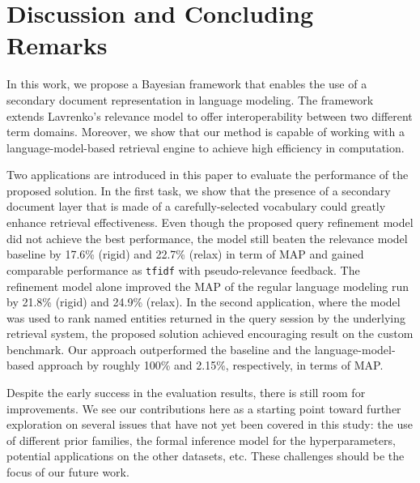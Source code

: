 \section{Discussion and Concluding Remarks}\label{s:concluding-remarks}

In this work, we propose a Bayesian framework that enables the use of a
secondary document representation in language modeling.  The framework extends
Lavrenko's relevance model to offer interoperability between two different
term domains.  Moreover, we show that our method is capable of working with a
language-model-based retrieval engine to achieve high efficiency in
computation.  

Two applications are introduced in this paper to evaluate the performance of
the proposed solution.  In the first task, we show that the presence of a
secondary document layer that is made of a carefully-selected vocabulary could
greatly enhance retrieval effectiveness.  Even though the proposed query
refinement model did not achieve the best performance, the model still beaten
the relevance model baseline by 17.6\% (rigid) and 22.7\% (relax) in term of
MAP and gained comparable performance as {\tt tfidf} with pseudo-relevance
feedback.  The refinement model alone improved the MAP of the regular language
modeling run by 21.8\% (rigid) and 24.9\% (relax).  In the second application,
where the model was used to rank named entities returned in the query session
by the underlying retrieval system, the proposed solution achieved encouraging
result on the custom benchmark.  Our approach outperformed the baseline and the language-model-based
approach \cite{balog2009language} by roughly 100\% and 2.15\%, respectively, in terms of MAP.

Despite the early success in the evaluation results, there is still room for
improvements.  We see our contributions here as a starting point toward further
exploration on several issues that have not yet been covered in this study: the
use of different prior families, the formal inference model for the
hyperparameters, potential applications on the other datasets, etc.  These
challenges should be the focus of our future work.


